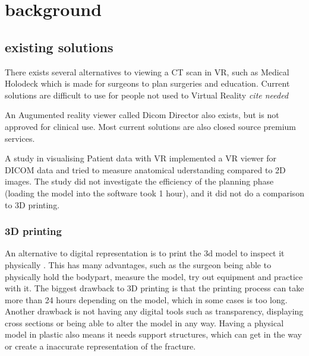 \documentclass[11pt]{scrartcl}
\begin{document}
\section{ background } 

\subsection{ existing solutions}


There exists several alternatives to viewing a CT scan in VR, such as Medical Holodeck \cite{holodeck} which is made for surgeons to plan surgeries and education. Current solutions are difficult to use for people not used to Virtual Reality \emph{cite needed}

An Augumented reality viewer called Dicom Director also exists, but is not approved for clinical use. \cite{dicomdirector} Most current solutions are also closed source premium services.

A study in visualising Patient data with VR \cite{vertemati_virtual_2019} implemented a VR viewer for DICOM data and tried to measure anatomical uderstanding compared to 2D images. The study did not investigate the efficiency of the planning phase (loading the model into the software took 1 hour), and it did not do a comparison to 3D printing.

\subsubsection { 3D printing }

An alternative to digital representation is to print the 3d model to inspect it physically \cite{virtualplanningand3dprinting}. This has many advantages, such as the surgeon being able to physically hold the bodypart, measure the model, try out equipment and practice with it.
The biggest drawback to 3D printing is that the printing process can take more than 24 hours depending on the model, which in some cases is too long. Another drawback is not having any digital tools such as transparency, displaying cross sections or being able to alter the model in any way. Having a physical model in plastic also means it needs support structures, which can get in the way or create a inaccurate representation of the fracture.
\end{document}
